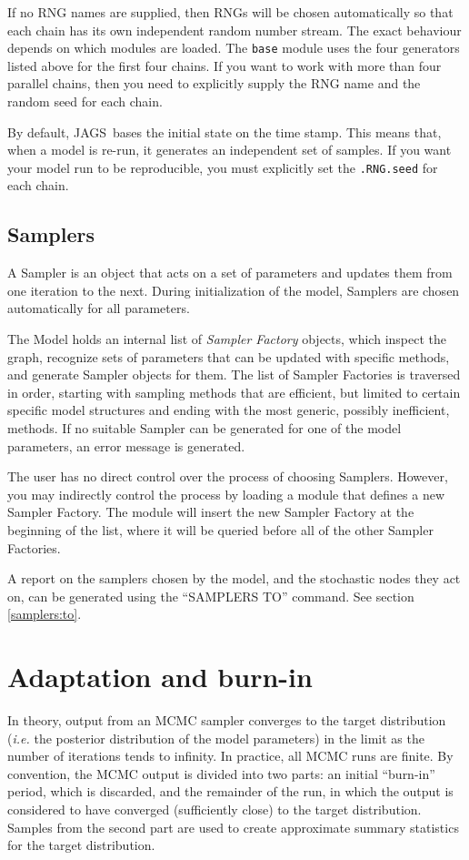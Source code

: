 \documentclass[11pt, a4paper, titlepage]{report}
\newcommand{\JAGS}{\textsf{JAGS}}
\begin{document}
If no RNG names are supplied, then RNGs will be chosen automatically
so that each chain has its own independent random number stream.  The
exact behaviour depends on which modules are loaded. The
\texttt{base} module uses the four generators listed above for the
first four chains.  If you want to work with more than four parallel
chains, then you need to explicitly supply the RNG name and the random
seed for each chain.

By default, \JAGS\ bases the initial state on the time stamp. This
means that, when a model is re-run, it generates an independent set of
samples. If you want your model run to be reproducible, you must
explicitly set the \verb+.RNG.seed+ for each chain.

\subsection{Samplers}

A Sampler is an object that acts on a set of parameters and updates
them from one iteration to the next. During initialization of the
model, Samplers are chosen automatically for all parameters. 

The Model holds an internal list of {\em Sampler Factory} objects,
which inspect the graph, recognize sets of parameters that can be
updated with specific methods, and generate Sampler objects for
them. The list of Sampler Factories is traversed in order, starting with
sampling methods that are efficient, but limited to certain specific
model structures and ending with the most generic, possibly
inefficient, methods. If no suitable Sampler can be generated for one
of the model parameters, an error message is generated.

The user has no direct control over the process of choosing
Samplers. However, you may indirectly control the process by loading a
module that defines a new Sampler Factory. The module will insert the
new Sampler Factory at the beginning of the list, where it will be
queried before all of the other Sampler Factories.

A report on the samplers chosen by the model, and the stochastic nodes
they act on, can be generated using the ``SAMPLERS TO'' command. See 
section \ref{samplers:to}.
 
\section{Adaptation and burn-in}

In theory, output from an MCMC sampler converges to the target
distribution ({\em i.e.} the posterior distribution of the model
parameters) in the limit as the number of iterations tends to
infinity. In practice, all MCMC runs are finite.  By convention, the
MCMC output is divided into two parts: an initial ``burn-in'' period,
which is discarded, and the remainder of the run, in which the output
is considered to have converged (sufficiently close) to the target
distribution. Samples from the second part are used to create
approximate summary statistics for the target distribution.
\end{document}
